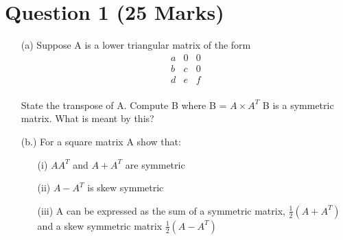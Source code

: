 \documentclass[12pt,a4paper]{article}
\begin{document}
\section*{Question 1 (25 Marks)}
\begin{itemize}
\item[(a)]
	Suppose A is a lower triangular matrix of the form 
	\[
	\begin{matrix}
	a & 0 & 0 \\
	b & c & 0 \\
	d & e & f \\
	\end{matrix}
	\]
	
	State the transpose of A.
	Compute B where B = $ A \times A^{T}$
	B is a symmetric matrix. What is meant by this?
	
		
\item[(b.)]For a square matrix A show that:
		
		\begin{itemize}
			\item[(i)] $AA^T$ and $A+A^T$ are symmetric
			\item[(ii)] $A-A^T$ is skew symmetric
			\item[(iii)] A can be expressed as the sum of a symmetric matrix, $\frac{1}{2}(A+A^T)$ and a skew 
			symmetric matrix $\frac{1}{2}(A-A^T)$
		\end{itemize}
		\end{itemize}
\end{document}
